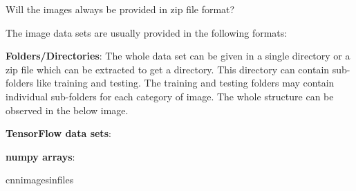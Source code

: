 	\begin{qanda}
		\begin{question}
Will the images always be provided in zip file format?
		\end{question}
		\begin{answer}
The image data sets are usually provided in the following formats:

	\begin{bulletedlist}
		\item {\bfseries Folders/Directories}: The whole data set can be given in a single directory or a zip file which can be extracted to get a directory. This directory can contain sub-folders like training and testing. The training and testing folders may contain individual sub-folders for each category of image. The whole structure can be observed in the below image.
		\item {\bfseries TensorFlow data sets}:
		\item {\bfseries numpy arrays}:
	\end{bulletedlist}
		\end{answer}
	\end{qanda}


cnnimagesinfiles


	\begin{qanda}
		\begin{question}

		\end{question}
		\begin{answer}

		\end{answer}
	\end{qanda}

	\begin{qanda}
		\begin{question}

		\end{question}
		\begin{answer}

		\end{answer}
	\end{qanda}

	\begin{qanda}
		\begin{question}

		\end{question}
		\begin{answer}

		\end{answer}
	\end{qanda}

